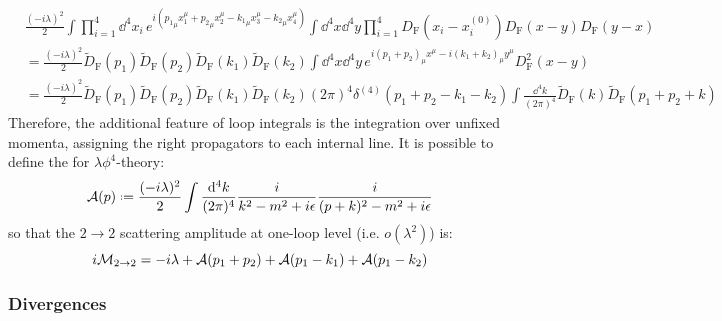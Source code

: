 \begin{equation*}
  \begin{split}
    & \frac{(-i \lambda)^2}{2} \int \prod_{i = 1}^4 \dd^4x_i\, e^{i ({p_1}_\mu x_1^\mu + {p_2}_\mu x_2^\mu - {k_1}_\mu x_3^\mu - {k_2}_\mu x_4^\mu)} \int \dd^4x \dd^4y \prod_{i = 1}^4 D_\text{F}(x_i - x_i^{(0)}) D_\text{F}(x - y) D_\text{F}(y - x) \\
    & = \frac{(-i \lambda)^2}{2} \tilde{D}_\text{F}(p_1) \tilde{D}_\text{F}(p_2) \tilde{D}_\text{F}(k_1) \tilde{D}_\text{F}(k_2) \int \dd^4x \dd^4y\, e^{i (p_1 + p_2)_\mu x^\mu - i (k_1 + k_2)_\mu y^\mu} D_\text{F}^2(x - y) \\
    & = \frac{(-i \lambda)^2}{2} \tilde{D}_\text{F}(p_1) \tilde{D}_\text{F}(p_2) \tilde{D}_\text{F}(k_1) \tilde{D}_\text{F}(k_2) (2\pi)^4 \delta^{(4)}(p_1 + p_2 - k_1 - k_2) \int \frac{\dd^4k}{(2\pi)^4} \tilde{D}_\text{F}(k) \tilde{D}_\text{F}(p_1 + p_2 + k)
  \end{split}
\end{equation*}
Therefore, the additional feature of loop integrals is the integration over unfixed momenta, assigning the right propagators to each internal line. It is possible to define the  for $ \lambda \phi^4 $-theory:
\begin{equation}
  \mathcal{A}(p) \defeq \frac{(-i \lambda)^2}{2} \int \frac{\dd^4k}{(2\pi)^4} \frac{i}{k^2 - m^2 + i \epsilon} \frac{i}{(p + k)^2 - m^2 + i \epsilon}
  \label{eq:f4-loop-ampl}
\end{equation}
so that the $ 2 \rightarrow 2 $ scattering amplitude at one-loop level (i.e. $ o(\lambda^2) $) is:
\begin{equation}
  i \mathcal{M}_{2 \rightarrow 2} = -i \lambda + \mathcal{A}(p_1 + p_2) + \mathcal{A}(p_1 - k_1) + \mathcal{A}(p_1 - k_2)
\end{equation}

\subsubsection{Divergences}
\label{sssec:div}

